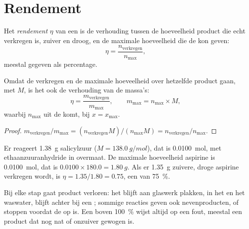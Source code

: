 \section{Rendement}

\begin{definition}[Rendement]\label{def:g10:synthesis-yield:yield}
Het \emph{rendement} $\eta$ van een  is de
verhouding tussen de hoeveelheid product die echt verkregen is, zuiver en
droog, en de maximale hoeveelheid die de  kon geven:
\[
  \eta = \frac{n_{\text{verkregen}}}{n_{\max}} ,
\]
meestal gegeven als percentage.
\end{definition}

\begin{proposition}\label{prop:g10:synthesis-yield:masses}
Omdat de verkregen en de maximale hoeveelheid over hetzelfde product
gaan, met  $M$, is het  ook de verhouding van de
massa's:
\[
  \eta = \frac{m_{\text{verkregen}}}{m_{\max}},
  \qquad m_{\max} = n_{\max} \times M,
\]
waarbij $n_{\max}$ uit de  komt, bij $x = x_{\max}$.
\end{proposition}

\begin{proof}
$m_{\text{verkregen}} / m_{\max} = (n_{\text{verkregen}} M) / (n_{\max} M)
= n_{\text{verkregen}} / n_{\max}$.
\end{proof}

\begin{example}\label{ex:g10:synthesis-yield:small}
Er reageert \qty{1.38}{g} salicylzuur ($M = \qty{138.0}{g/mol}$), dat is
\qty{0.0100}{mol}, met ethaanzuuranhydride in overmaat. De maximale
hoeveelheid aspirine is \qty{0.0100}{mol}, dat is
$0.0100 \times 180.0 = \qty{1.80}{g}$. Als er \qty{1.35}{g} zuivere,
droge aspirine verkregen wordt, is $\eta = 1.35 / 1.80 = 0.75$, een
 van \qty{75}{\percent}.
\end{example}

\begin{remark}\label{rem:g10:synthesis-yield:below}
Bij elke stap gaat product verloren: het blijft aan glaswerk plakken,
 in het  en het waswater, blijft achter bij een
; sommige reacties geven ook nevenproducten, of stoppen
voordat de  op is. Een  boven
\qty{100}{\percent} wijst altijd op een fout, meestal een product dat
nog nat of onzuiver gewogen is.
\end{remark}

